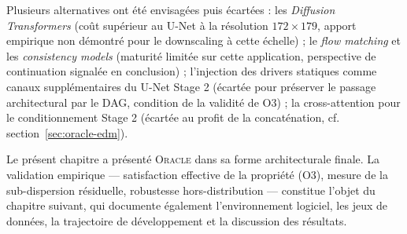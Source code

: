 \documentclass[14pt,a4paper,openany]{extreport}
\theoremstyle{definition}
\newcommand{\Oracle}{\textsc{Oracle}}
\begin{document}
Plusieurs alternatives ont été envisagées puis écartées : les \emph{Diffusion Transformers} (coût supérieur au U-Net à la résolution $172\times 179$, apport empirique non démontré pour le downscaling à cette échelle) ; le \emph{flow matching} et les \emph{consistency models} (maturité limitée sur cette application, perspective de continuation signalée en conclusion) ; l'injection des drivers statiques comme canaux supplémentaires du U-Net Stage 2 (écartée pour préserver le passage architectural par le DAG, condition de la validité de O3) ; la cross-attention pour le conditionnement Stage 2 (écartée au profit de la concaténation, cf. section~\ref{sec:oracle-edm}).

Le présent chapitre a présenté \Oracle{} dans sa forme architecturale finale. La validation empirique --- satisfaction effective de la propriété (O3), mesure de la sub-dispersion résiduelle, robustesse hors-distribution --- constitue l'objet du chapitre suivant, qui documente également l'environnement logiciel, les jeux de données, la trajectoire de développement et la discussion des résultats.
\end{document}
